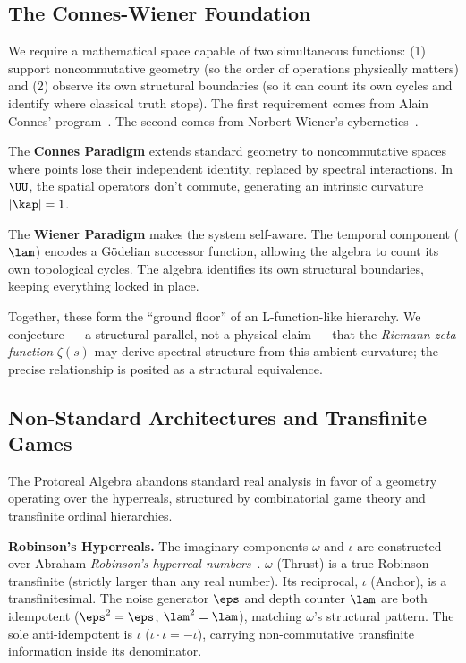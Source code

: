\subsection{The Connes-Wiener Foundation}\label{sec:connes-wiener}

We require a mathematical space capable of two simultaneous functions: (1) support noncommutative geometry (so the order of operations physically matters) and (2) observe its own structural boundaries (so it can count its own cycles and identify where classical truth stops). The first requirement comes from Alain Connes' program~\cite{connes}. The second comes from Norbert Wiener's cybernetics~\cite{wiener}.

The \textbf{Connes Paradigm} extends standard geometry to noncommutative spaces where points lose their independent identity, replaced by spectral interactions. In $\UU$, the spatial operators don't commute, generating an intrinsic curvature $|\kap| = 1$.

The \textbf{Wiener Paradigm} makes the system self-aware. The temporal component ($\lam$) encodes a G\"odelian successor function, allowing the algebra to count its own topological cycles. The algebra identifies its own structural boundaries, keeping everything locked in place.

Together, these form the ``ground floor'' of an L-function-like hierarchy. We conjecture --- a structural parallel, not a physical claim --- that the \emph{Riemann zeta function} $\zeta(s)$ may derive spectral structure from this ambient curvature; the precise relationship is posited as a structural equivalence.

\subsection{Non-Standard Architectures and Transfinite Games}

The Protoreal Algebra abandons standard real analysis in favor of a geometry operating over the hyperreals, structured by combinatorial game theory and transfinite ordinal hierarchies.

\textbf{Robinson's Hyperreals.} The imaginary components $\omega$ and $\iota$ are constructed over Abraham \emph{Robinson's hyperreal numbers}~\cite{robinson}. $\omega$ (Thrust) is a true Robinson transfinite (strictly larger than any real number). Its reciprocal, $\iota$ (Anchor), is a transfinitesimal. The noise generator $\eps$ and depth counter $\lam$ are both idempotent ($\eps^2 = \eps$, $\lam^2 = \lam$), matching $\omega$'s structural pattern. The sole anti-idempotent is $\iota$ ($\iota \cdot \iota = -\iota$), carrying non-commutative transfinite information inside its denominator.


